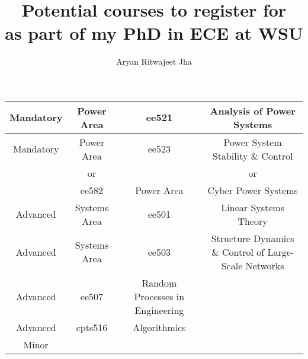 \documentclass{article}
\author{Aryan Ritwajeet Jha}
\date{}
\title{Potential courses to register for \\ as part of my PhD in ECE at WSU}
\begin{document}
	\maketitle
	
	\begin{tabular}{|c|c|c|c}
		\hline
		Mandatory & Power Area & ee521 & Analysis of Power Systems \\
		\hline
		Mandatory & Power Area & ee523 & Power System Stability \& Control \\
		 & or &  & or \\
		 & ee582 & Power Area & Cyber Power Systems \\
		 \hline
		Advanced & Systems Area & ee501 & Linear Systems Theory \\ 
		\hline
		Advanced & Systems Area & ee503 & Structure Dynamics \& Control of Large-Scale Networks  \\ \hline
		Advanced & ee507 & Random Processes in Engineering \\ \hline
		Advanced & cpts516 & Algorithmics \\
		\hline
		Minor
	\end{tabular}
\end{document}
